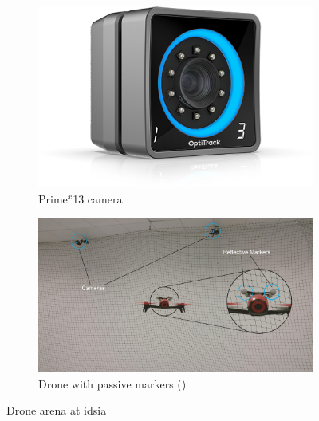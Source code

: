 \begin{figure}[!htb]
	\begin{center}
		\begin{subfigure}[h]{0.29\textwidth}
			\centering
			\includegraphics[width=1\textwidth]{"contents/images/03-optitrack-camera"}
			\caption[]{Prime$^x$13 camera}
			\label{fig:optitrack-camera}
		\end{subfigure}
		\hfill
		\begin{subfigure}[h]{0.69\textwidth}
			\centering
			\includegraphics[width=1\textwidth]{"contents/images/03-arena"}
			\caption[]{Drone with passive markers (\cite{mantegazza2018thesis})}
			\label{fig:drone-arena}
		\end{subfigure}
	\end{center}
	\vspace{-0.5cm}
	\caption[Drone arena at \gls{idsia}]{Drone arena at \gls{idsia}}
\end{figure}



